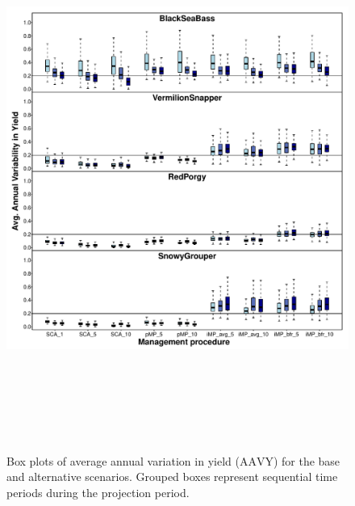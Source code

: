 \documentclass[12pt,english]{article}
\begin{document}
\begin{figure}[!ht]
\begin{center}
\includegraphics[width=6in,height=7in]{../Figs/boxplotAAVY1.pdf}
\end{center}
\begin{flushleft}
\caption{Box plots of average annual variation in yield ($\mathrm{AAVY}$) for the base and alternative scenarios. Grouped boxes represent sequential time periods during the projection period.}
\label{fig:boxplotAAVY1}
\end{flushleft}
\end{figure}
\end{document}
